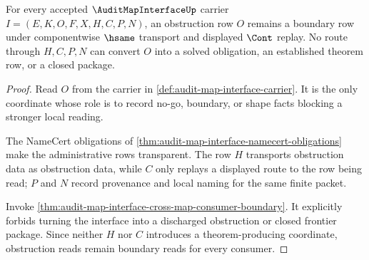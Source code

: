 \begin{theorem}
\label{thm:audit-map-interface-obstruction-row-nonescape}
For every accepted $\AuditMapInterfaceUp$ carrier $I=(E,K,O,F,X,H,C,P,N)$, an obstruction row $O$ remains a boundary row under componentwise $\hsame$ transport and displayed $\Cont$ replay. No route through $H,C,P,N$ can convert $O$ into a solved obligation, an established theorem row, or a closed package.
\end{theorem}
\begin{proof}
Read $O$ from the carrier in \autoref{def:audit-map-interface-carrier}. It is the only coordinate whose role is to record no-go, boundary, or shape facts blocking a stronger local reading.

The NameCert obligations of \autoref{thm:audit-map-interface-namecert-obligations} make the administrative rows transparent. The row $H$ transports obstruction data as obstruction data, while $C$ only replays a displayed route to the row being read; $P$ and $N$ record provenance and local naming for the same finite packet.

Invoke \autoref{thm:audit-map-interface-cross-map-consumer-boundary}. It explicitly forbids turning the interface into a discharged obstruction or closed frontier package. Since neither $H$ nor $C$ introduces a theorem-producing coordinate, obstruction reads remain boundary reads for every consumer.
\end{proof}

